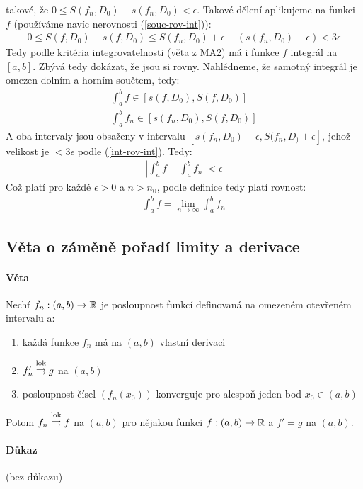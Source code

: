 \documentclass[a4paper,10pt]{article}
\begin{document}
takové, že $0 \le S(f_n, D_0) - s(f_n, D_0) < \epsilon$. Takové dělení
aplikujeme na funkci $f$ (používáme navíc nerovnosti
(\ref{souc-rov-int})):
\begin{align}
	\label{int-rov-int} 0 \le S(f, D_0) - s(f, D_0) \le S(f_n, D_0) + \epsilon - (s(f_n, D_0) -
	\epsilon) < 3 \epsilon
\end{align}
Tedy podle kritéria integrovatelnosti (věta z MA2) má i funkce $f$ integrál na
$[a,b]$. Zbývá tedy dokázat, že jsou si rovny. Nahlédneme, že samotný integrál
je omezen dolním a horním součtem, tedy:
\begin{align}
	\int_a^b f \in  [s(f,D_0), S(f, D_0)] \\
	\int_a^b f_n \in [s(f_n, D_0), S(f, D_0)]
\end{align}
A oba intervaly jsou obsaženy v intervalu $[s(f_n, D_0) - \epsilon, S(f_n, D_) +
\epsilon]$, jehož velikost je $<3\epsilon$ podle (\ref{int-rov-int}). Tedy:
\begin{align}
	\left| \int_a^b f - \int_a^b f_n \right | < \epsilon
\end{align}
Což platí pro každé $\epsilon > 0$ a $n > n_0$, podle definice tedy platí
rovnost:
\begin{align}
	\int_a^b f = \lim_{n\to\infty} \int_a^b f_n
\end{align}


\subsection{Věta o záměně pořadí limity  a derivace}
\setcounter{equation}{0}
\paragraph{Věta}
Nechť $f_n : (a,b) \to \mathbb{R}$ je posloupnost funkcí definovaná na omezeném
otevřeném intervalu a:
\begin{enumerate}
	\item každá funkce $f_n$ má na $(a,b)$ vlastní derivaci
	\item $f_n' \overset{\text{lok}}{\rightrightarrows} g$ na $(a,b)$
	\item posloupnost čísel $(f_n(x_0))$ konverguje pro alespoň jeden bod 
		$x_0	\in (a,b)$
\end{enumerate}
Potom $f_n \overset{\text{lok}}{\rightrightarrows} f$ na $(a,b)$ pro nějakou funkci $f: (a,b) \to \mathbb{R}$ a $f' = g$ na
$(a,b)$.
\paragraph{Důkaz}
(bez důkazu)
\end{document}
